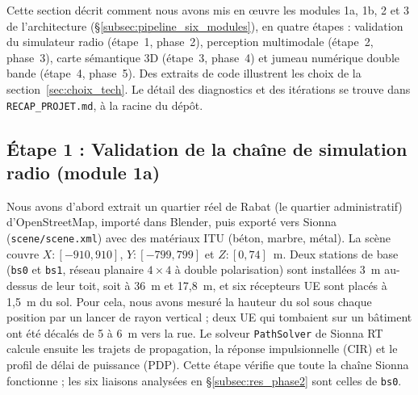 \documentclass[12pt,a4paper,titlepage]{article}
\begin{document}
Cette section décrit comment nous avons mis en \oe uvre les modules 1a, 1b, 2 et 3 de l'architecture (\S\ref{subsec:pipeline_six_modules}), en quatre étapes : validation du simulateur radio (étape~1, phase~2), perception multimodale (étape~2, phase~3), carte sémantique 3D (étape~3, phase~4) et jumeau numérique double bande (étape~4, phase~5). Des extraits de code illustrent les choix de la section~\ref{sec:choix_tech}. Le détail des diagnostics et des itérations se trouve dans \texttt{RECAP\_PROJET.md}, à la racine du dépôt.

\subsection{Étape 1 : Validation de la chaîne de simulation radio (module 1a)}

Nous avons d'abord extrait un quartier réel de Rabat (le quartier administratif) d'OpenStreetMap, importé dans Blender, puis exporté vers Sionna (\texttt{scene/scene.xml}) avec des matériaux ITU (béton, marbre, métal). La scène couvre $X\!:\![-910,910]$, $Y\!:\![-799,799]$ et $Z\!:\![0,74]$~m. Deux stations de base (\texttt{bs0} et \texttt{bs1}, réseau planaire $4\times4$ à double polarisation) sont installées 3~m au-dessus de leur toit, soit à 36~m et 17,8~m, et six récepteurs UE sont placés à 1,5~m du sol. Pour cela, nous avons mesuré la hauteur du sol sous chaque position par un lancer de rayon vertical ; deux UE qui tombaient sur un bâtiment ont été décalés de 5 à 6~m vers la rue. Le solveur \texttt{PathSolver} de Sionna RT calcule ensuite les trajets de propagation, la réponse impulsionnelle (CIR) et le profil de délai de puissance (PDP). Cette étape vérifie que toute la chaîne Sionna fonctionne ; les six liaisons analysées en \S\ref{subsec:res_phase2} sont celles de \texttt{bs0}.
\end{document}
